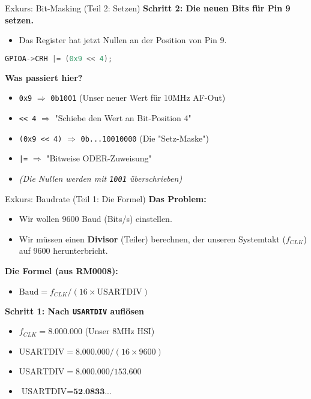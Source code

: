 \documentclass{beamer}
\begin{document}
\begin{frame}[fragile]{Exkurs: Bit-Masking (Teil 2: Setzen)}
	\textbf{Schritt 2: Die neuen Bits für Pin 9 setzen.}
	\begin{itemize}
		\item Das Register hat jetzt Nullen an der Position von Pin 9.
	\end{itemize}
	
	\bigskip
	\begin{lstlisting}[language=C, style=mystyle]
		GPIOA->CRH |= (0x9 << 4);
	\end{lstlisting}
	
	\textbf{Was passiert hier?}
	\begin{itemize}
		\item \texttt{0x9} $\Rightarrow$ \texttt{0b1001} (Unser neuer Wert für 10MHz AF-Out)
		\item \texttt{<< 4} $\Rightarrow$ "Schiebe den Wert an Bit-Position 4"
		\item \texttt{(0x9 << 4)} $\Rightarrow$ \texttt{0b...10010000} (Die "Setz-Maske")
		\item \texttt{|=} $\Rightarrow$ "Bitweise ODER-Zuweisung"
		\item \textit{(Die Nullen werden mit \texttt{1001} überschrieben)}
	\end{itemize}
\end{frame}

\begin{frame}{Exkurs: Baudrate (Teil 1: Die Formel)}
	\textbf{Das Problem:}
	\begin{itemize}
		\item Wir wollen 9600 Baud (Bits/s) einstellen.
		\item Wir müssen einen \textbf{Divisor} (Teiler) berechnen, der unseren Systemtakt ($f_{CLK}$) auf 9600 herunterbricht.
	\end{itemize}
	
	\textbf{Die Formel (aus RM0008):}
	\begin{itemize}
		\item $\text{Baud} = f_{CLK} / (16 \times \text{USARTDIV})$
	\end{itemize}
	
	\textbf{Schritt 1: Nach \texttt{USARTDIV} auflösen}
	\begin{itemize}
		\item $f_{CLK} = 8.000.000$ (Unser 8MHz HSI)
		\item $\text{USARTDIV} = 8.000.000 / (16 \times 9600)$
		\item $\text{USARTDIV} = 8.000.000 / 153.600$
		\item $\text{USARTDIV} = \textbf{52.0833...}$
	\end{itemize}
\end{frame}
\end{document}
